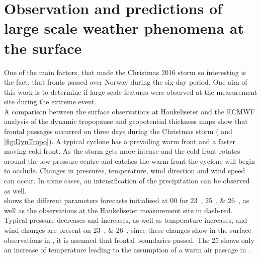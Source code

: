 \section{Observation and predictions of large scale weather phenomena at the surface}\label{sec:res:large_scale_sfc}
One of the main factors, that made the Christmas 2016 storm so interesting is the fact, that fronts passed over Norway during the six-day period. One aim of this work is to determine if large scale features were observed at the measurement site during the extreme event. 
\\
A comparison between the surface observations at Haukeliseter and the ECMWF analysis of the dynamic tropopause and geopotential thickness maps show that frontal passages occurred on three days during the Christmas storm ( and \ref{fig:DynTropo}).  
A typical cyclone has a prevailing warm front and a faster moving cold front. As the storm gets more intense and the cold front rotates around the low-pressure centre and catches the warm front the cyclone will begin to occlude. Changes in pressures, temperature, wind direction and wind speed can occur. In some cases, an intensification of the precipitation can be observed as well.
\\
 shows the different parameters forecasts initialised at \SI{00}{\UTC} for \SIlist{23;25;26}{\dec}, as well as the observations at the Haukeliseter measurement site in dash-red.
Typical pressure decreases and increases, as well as temperature increases, and wind changes are present on \SIlist{23;26}{\dec}, since these changes show in the surface observations in , it is assumed that frontal boundaries passed. The \SI{25}{\dec} shows only an increase of temperature leading to the assumption of a warm air passage in .

